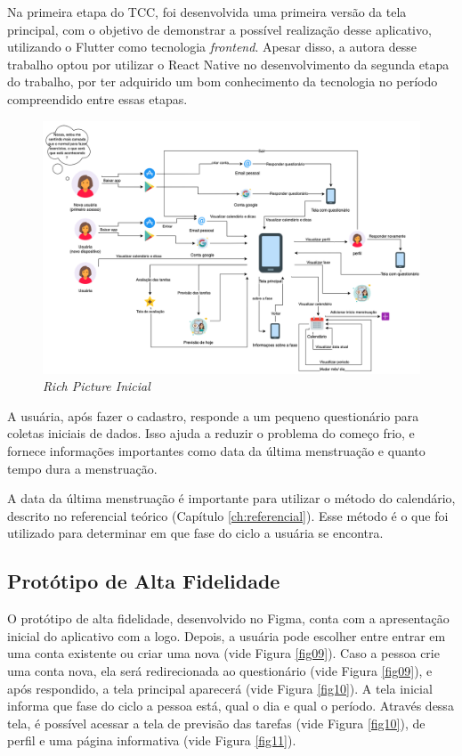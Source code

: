 Na primeira etapa do TCC, foi desenvolvida uma primeira versão da tela principal, com o objetivo de demonstrar a possível 
realização desse aplicativo, utilizando o Flutter como tecnologia \emph{frontend}. Apesar disso, a autora desse trabalho 
optou por utilizar o React Native no desenvolvimento da segunda etapa do trabalho, 
por ter adquirido um bom conhecimento da tecnologia no período compreendido entre essas etapas.
 
\begin{figure}[htbp]
	\caption{\emph{Rich Picture Inicial}}
	\begin{center}
	\includegraphics[keepaspectratio=true,scale=0.37]{figuras/richPicture.png}
	\end{center}
    \label{fig08}
\end{figure}

A usuária, após fazer o cadastro, responde a um pequeno 
questionário para coletas iniciais de dados. Isso ajuda a reduzir 
o problema do começo frio, e fornece informações importantes
como data da última menstruação e quanto tempo dura a menstruação.

A data da última menstruação é importante para utilizar o 
método do calendário, descrito no referencial teórico (Capítulo \ref{ch:referencial}). 
Esse método é o que foi utilizado para determinar em que 
fase do ciclo a usuária se encontra.

\subsection{Protótipo de Alta Fidelidade}

O protótipo de alta fidelidade, desenvolvido no Figma, conta com a apresentação 
inicial do aplicativo com a logo. Depois, a usuária 
pode escolher entre entrar em uma conta existente ou criar 
uma nova (vide Figura \ref{fig09}). Caso a pessoa crie uma conta 
nova, ela será 
redirecionada ao questionário (vide Figura \ref{fig09}), e após 
respondido, a 
tela principal aparecerá (vide Figura \ref{fig10}). A tela inicial informa que 
fase do ciclo a pessoa está, qual o dia 
e qual o período. Através dessa tela, é possível acessar 
a tela de previsão das tarefas (vide Figura \ref{fig10}), de perfil
e uma página informativa (vide Figura \ref{fig11}).

